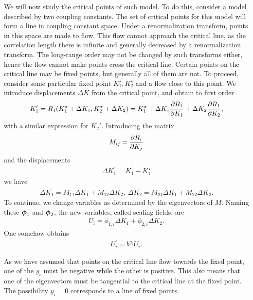 We will now study the critical points of such model. To do this, consider a model described by two coupling constants. The set of critical points for this model will form a line in coupling constant space. Under a renormalization transform, points in this space are made to flow. This flow cannot approach the critical line, as the correlation length there is infinite and generally decreased by a renormalization transform. The long-range order may not be changed by such transforms either, hence the flow cannot make points cross the critical line. Certain points on the critical line may be fixed points, but generally all of them are not. To proceed, consider some particular fixed point $K_{1}^{\star}, K_{2}^{\star}$ and a flow close to this point. We introduce displacements $\Delta K$ from the critical point, and obtain to first order
\begin{align*}
	K_{1}^{\prime} = R_{1}(K_{1}^{\star} + \Delta K_{1}, K_{2}^{\star} + \Delta K_{2}) = K_{1}^{\star} + \Delta K_{1}\pdv{R_{1}}{K_{1}} + \Delta K_{2}\pdv{R_{1}}{K_{2}},
\end{align*}
with a similar expression for $K_{2}\prime$. Introducing the matrix
\begin{align*}
	M_{ij} = \pdv{R_{i}}{K_{j}}
\end{align*}
and the displacements
\begin{align*}
	\Delta K_{1}^{\prime} = K_{1}^{\prime} - K_{1}^{\star}
\end{align*}
we have
\begin{align*}
	\Delta K_{1}^{\prime} = M_{11}\Delta K_{1} + M_{12}\Delta K_{2},\ \Delta K_{2}^{\prime} = M_{21}\Delta K_{1} + M_{22}\Delta K_{2}.
\end{align*}
To continue, we change variables as determined by the eigenvectors of $M$. Naming these $\vb*{\phi}_{1}$ and $\vb*{\phi}_{2}$, the new variables, called scaling fields, are
\begin{align*}
	U_{i} = \phi_{1, i}\Delta K_{1} + \phi_{2, i}\Delta K_{2}.
\end{align*}
One somehow obtains
\begin{align*}
	U_{i}^{\prime} = b^{y_{i}}U_{i}.
\end{align*}

As we have assumed that points on the critical line flow towards the fixed point, one of the $y_{i}$ must be negative while the other is positive. This also means that one of the eigenvectors must be tangential to the critical line at the fixed point. The possibility $y_{i} = 0$ corresponds to a line of fixed points.

